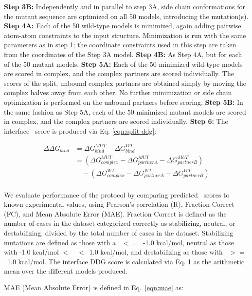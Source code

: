 \textbf{Step 3B:} Independently and in parallel to step 3A, side chain conformations for the mutant sequence are optimized on all 50 models, introducing the mutation(s).
\textbf{Step 4A:} Each of the 50 wild-type models is minimized, again adding pairwise atom-atom constraints to the input structure. Minimization is run with the same parameters as in step 1; the coordinate constraints used in this step are taken from the coordinates of the Step 3A model.
\textbf{Step 4B:} As Step 4A, but for each of the 50 mutant models.
\textbf{Step 5A:} Each of the 50 minimized wild-type models are scored in complex, and the complex partners are scored individually. The scores of the split, unbound complex partners are obtained simply by moving the complex halves away from each other. No further minimization or side chain optimization is performed on the unbound partners before scoring.
\textbf{Step 5B:} In the same fashion as Step 5A, each of the 50 minimized mutant models are scored in complex, and the complex partners are scored individually.
\textbf{Step 6:} The interface \ddg\ score is produced via Eq. \ref{eqn:split-ddg}:

\begin{equation}\label{eqn:split-ddg}
  \begin{split}
    {\Delta\Delta}G_{bind} & ={\Delta}G^{MUT}_{bind} - {\Delta}G^{WT}_{bind}\\
    & =({\Delta}G^{MUT}_{complex} - {\Delta}G^{MUT}_{partner A} - {\Delta}G^{MUT}_{partner B})\\
    & \quad - ({\Delta}G^{WT}_{complex} - {\Delta}G^{WT}_{partner A} - {\Delta}G^{WT}_{partner B})\\
  \end{split}
\end{equation}

We evaluate performance of the protocol by comparing predicted \ddg\ scores to known experimental values, using Pearson's correlation (R), Fraction Correct (FC), and Mean Absolute Error (MAE). Fraction Correct is defined as the number of cases in the dataset categorized correctly as stabilizing, neutral, or destabilizing, divided by the total number of cases in the dataset. Stabilizing mutations are defined as those with a \ddg\ $<=$\ -1.0 kcal/mol, neutral as those with -1.0 kcal/mol $<$\ \ddg\ $<$\ 1.0 kcal/mol, and destabilizing as those with \ddg\ $>=$\ 1.0 kcal/mol. The interface DDG score is calculated via Eq. 1 as the arithmetic mean over the different models produced.

MAE (Mean Absolute Error) is defined in Eq.~\ref{eqn:mae} as:

